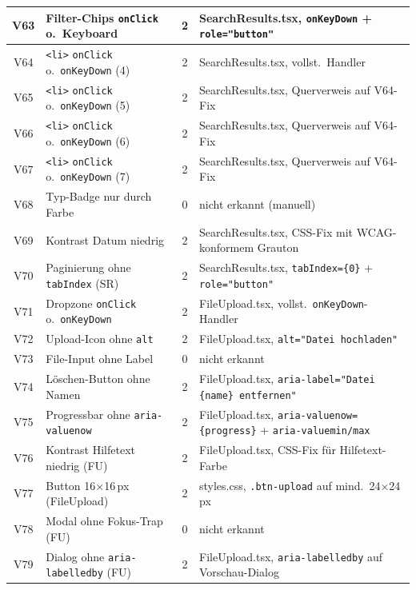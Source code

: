 \begin{longtable}{|c|p{5.0cm}|c|p{5.4cm}|}
V63  & Filter-Chips \texttt{onClick} o.\ Keyboard   & 2 & SearchResults.tsx, \texttt{onKeyDown} + \texttt{role="button"} \\ \hline
V64  & \texttt{<li>} \texttt{onClick} o.\ \texttt{onKeyDown} (4) & 2 & SearchResults.tsx, vollst.\ Handler \\ \hline
V65  & \texttt{<li>} \texttt{onClick} o.\ \texttt{onKeyDown} (5) & 2 & SearchResults.tsx, Querverweis auf V64-Fix \\ \hline
V66  & \texttt{<li>} \texttt{onClick} o.\ \texttt{onKeyDown} (6) & 2 & SearchResults.tsx, Querverweis auf V64-Fix \\ \hline
V67  & \texttt{<li>} \texttt{onClick} o.\ \texttt{onKeyDown} (7) & 2 & SearchResults.tsx, Querverweis auf V64-Fix \\ \hline
V68  & Typ-Badge nur durch Farbe                    & 0 & nicht erkannt (manuell) \\ \hline
V69  & Kontrast Datum niedrig                       & 2 & SearchResults.tsx, CSS-Fix mit WCAG-konformem Grauton \\ \hline
V70  & Paginierung ohne \texttt{tabIndex} (SR)      & 2 & SearchResults.tsx, \texttt{tabIndex=\{0\}} + \texttt{role="button"} \\ \hline
V71  & Dropzone \texttt{onClick} o.\ \texttt{onKeyDown} & 2 & FileUpload.tsx, vollst.\ \texttt{onKeyDown}-Handler \\ \hline
V72  & Upload-Icon ohne \texttt{alt}                & 2 & FileUpload.tsx, \texttt{alt="Datei hochladen"} \\ \hline
V73  & File-Input ohne Label                        & 0 & nicht erkannt \\ \hline
V74  & Löschen-Button ohne Namen                   & 2 & FileUpload.tsx, \texttt{aria-label="Datei \{name\} entfernen"} \\ \hline
V75  & Progressbar ohne \texttt{aria-valuenow}      & 2 & FileUpload.tsx, \texttt{aria-valuenow=\{progress\}} + \texttt{aria-valuemin/max} \\ \hline
V76  & Kontrast Hilfetext niedrig (FU)              & 2 & FileUpload.tsx, CSS-Fix für Hilfetext-Farbe \\ \hline
V77  & Button 16$\times$16\,px (FileUpload)         & 2 & styles.css, \texttt{.btn-upload} auf mind.\ 24$\times$24\,px \\ \hline
V78  & Modal ohne Fokus-Trap (FU)                   & 0 & nicht erkannt \\ \hline
V79  & Dialog ohne \texttt{aria-labelledby} (FU)    & 2 & FileUpload.tsx, \texttt{aria-labelledby} auf Vorschau-Dialog \\ \hline

\end{longtable}
